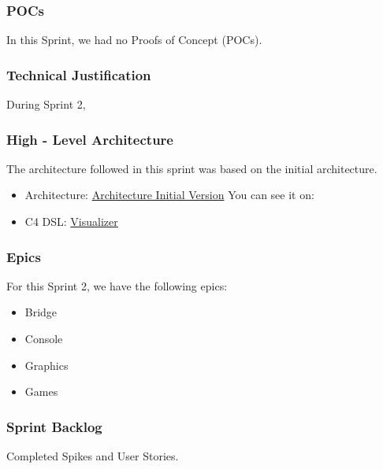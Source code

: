 \subsubsection{POCs}

In this Sprint, we had no Proofs of Concept (POCs).

\subsubsection{Technical Justification}

During Sprint 2, 

\subsubsection{High - Level Architecture}

The architecture followed in this sprint was based on the initial architecture.

\begin{itemize}
    \item Architecture: \href{https://github.com/Pending-Name-21/arquitecture/pull/1/files}{Architecture Initial Version}
    You can see it on: 
    \item C4 DSL: \href{https://structurizr.com/dsl}{Visualizer}
\end{itemize}

\newpage

\subsubsection{Epics}

For this Sprint 2, we have the following epics:

\begin{itemize}
    \item Bridge
    \item Console
    \item Graphics
    \item Games
\end{itemize}

\subsubsection{Sprint Backlog}

Completed Spikes and User Stories.

